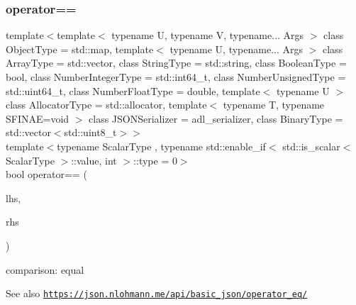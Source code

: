\subsubsection{\texorpdfstring{operator==}{operator==}\hspace{0.1cm}{\footnotesize\ttfamily [3/3]}}
{\footnotesize\ttfamily template$<$template$<$ typename U, typename V, typename... Args $>$ class Object\+Type = std\+::map, template$<$ typename U, typename... Args $>$ class Array\+Type = std\+::vector, class String\+Type  = std\+::string, class Boolean\+Type  = bool, class Number\+Integer\+Type  = std\+::int64\+\_\+t, class Number\+Unsigned\+Type  = std\+::uint64\+\_\+t, class Number\+Float\+Type  = double, template$<$ typename U $>$ class Allocator\+Type = std\+::allocator, template$<$ typename T, typename S\+F\+I\+N\+A\+E=void $>$ class J\+S\+O\+N\+Serializer = adl\+\_\+serializer, class Binary\+Type  = std\+::vector$<$std\+::uint8\+\_\+t$>$$>$ \\
template$<$typename Scalar\+Type , typename std\+::enable\+\_\+if$<$ std\+::is\+\_\+scalar$<$ Scalar\+Type $>$\+::value, int $>$\+::type  = 0$>$ \\
bool operator== (\begin{DoxyParamCaption}\item[{Scalar\+Type}]{lhs,  }\item[{\hyperlink{classnlohmann_1_1basic__json_ab8a1c33ee7b154fc41ca2545aa9724e6}{const\+\_\+reference}}]{rhs }\end{DoxyParamCaption})\hspace{0.3cm}{\ttfamily [friend]}}



comparison\+: equal 

\begin{DoxySeeAlso}{See also}
\href{https://json.nlohmann.me/api/basic_json/operator_eq/}{\tt https\+://json.\+nlohmann.\+me/api/basic\+\_\+json/operator\+\_\+eq/} 
\end{DoxySeeAlso}
\mbox{\label{classnlohmann_1_1basic__json_a87db51b6b936fb2ea293cdbc8702dcb8}} 
